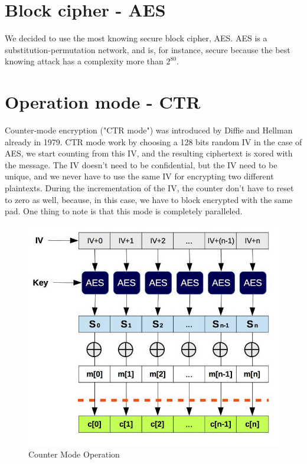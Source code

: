 \documentclass[10pt,a4paper]{report}
\begin{document}
\section{Block cipher - AES}
We decided to use the most knowing secure block cipher, AES.
AES is a substitution-permutation network, and is, for instance, secure because the best knowing attack has a complexity more than $2^{80}$.

\section{Operation mode - CTR}

Counter-mode encryption ("CTR mode") was introduced by Diffie and Hellman already in 1979.
CTR mode work by choosing a 128 bits random IV in the case of AES,  we start counting from this IV, and the resulting ciphertext is xored with the message.  \newline \newline
The IV doesn't need to be confidential, but the IV need to be unique, and we never have to use the same IV for encrypting two different plaintexts. During the incrementation of the IV, the counter don't have to reset to zero as well, because, in this case, we have to block encrypted with the same pad.
One thing to note is that this mode is completely paralleled. \newline


\begin{figure}[H]
\centerline{\includegraphics[scale=0.5]{img/ctr.jpg}}
\caption{Counter Mode Operation}
\end{figure}
\end{document}
